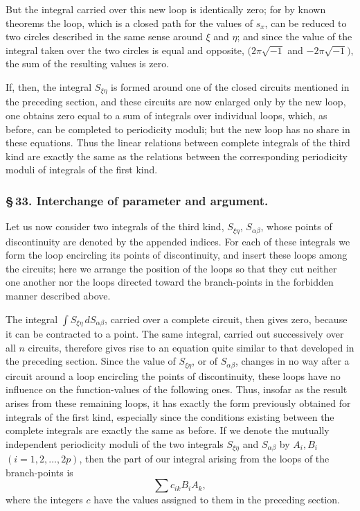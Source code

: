 \documentclass[10pt]{article}
\begin{document}
But the integral carried over this new loop is identically zero; for by known theorems the loop, which is a closed path for the values of \(s_x\), can be reduced to two circles described in the same sense around \(\xi\) and \(\eta\); and since the value of the integral taken over the two circles is equal and opposite, \((2\pi\sqrt{-1}\) and \(-2\pi\sqrt{-1})\), the sum of the resulting values is zero.

If, then, the integral \(S_{\xi\eta}\) is formed around one of the closed circuits mentioned in the preceding section, and these circuits are now enlarged only by the new loop, one obtains zero equal to a sum of integrals over individual loops, which, as before, can be completed to periodicity moduli; but the new loop has no share in these equations. Thus the linear relations between complete integrals of the third kind are exactly the same as the relations between the corresponding periodicity moduli of integrals of the first kind.

\subsubsection*{\S\,33. Interchange of parameter and argument.}

Let us now consider two integrals of the third kind, \(S_{\xi\eta}\), \(S_{\alpha\beta}\), whose points of discontinuity are denoted by the appended indices. For each of these integrals we form the loop encircling its points of discontinuity, and insert these loops among the circuits; here we arrange the position of the loops so that they cut neither one another nor the loops directed toward the branch-points in the forbidden manner described above.

The integral \(\int S_{\xi\eta}\,dS_{\alpha\beta}\), carried over a complete circuit, then gives zero, because it can be contracted to a point. The same integral, carried out successively over all \(n\) circuits, therefore gives rise to an equation quite similar to that developed in the preceding section. Since the value of \(S_{\xi\eta}\), or of \(S_{\alpha\beta}\), changes in no way after a circuit around a loop encircling the points of discontinuity, these loops have no influence on the function-values of the following ones. Thus, insofar as the result arises from these remaining loops, it has exactly the form previously obtained for integrals of the first kind, especially since the conditions existing between the complete integrals are exactly the same as before. If we denote the mutually independent periodicity moduli of the two integrals \(S_{\xi\eta}\) and \(S_{\alpha\beta}\) by \(A_i,B_i\) \((i=1,2,\ldots,2p)\), then the part of our integral arising from the loops of the branch-points is
\[
\sum c_{ik}B_iA_k,
\]
where the integers \(c\) have the values assigned to them in the preceding section.
\end{document}
